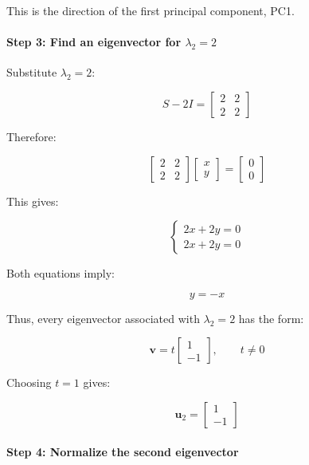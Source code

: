 \documentclass[11pt]{article}
\begin{document}
This is the direction of the first principal component, PC1.

\paragraph{\texorpdfstring{Step 3: Find an eigenvector for
\(\lambda_2=2\)}{Step 3: Find an eigenvector for \textbackslash lambda\_2=2}}\label{step-3-find-an-eigenvector-for-lambda_22}

Substitute \(\lambda_2=2\):

\[
S-2I=
\begin{bmatrix}
2 & 2\\
2 & 2
\end{bmatrix}
\]

Therefore:

\[
\begin{bmatrix}
2 & 2\\
2 & 2
\end{bmatrix}
\begin{bmatrix}
x\\
y
\end{bmatrix}
=
\begin{bmatrix}
0\\
0
\end{bmatrix}
\]

This gives:

\[
\begin{cases}
2x+2y=0\\
2x+2y=0
\end{cases}
\]

Both equations imply:

\[
y=-x
\]

Thus, every eigenvector associated with \(\lambda_2=2\) has the form:

\[
\mathbf{v}=
t\begin{bmatrix}
1\\
-1
\end{bmatrix},
\qquad t\neq0
\]

Choosing \(t=1\) gives:

\[
\mathbf{u}_2=
\begin{bmatrix}
1\\
-1
\end{bmatrix}
\]

\paragraph{Step 4: Normalize the second
eigenvector}\label{step-4-normalize-the-second-eigenvector}
\end{document}
